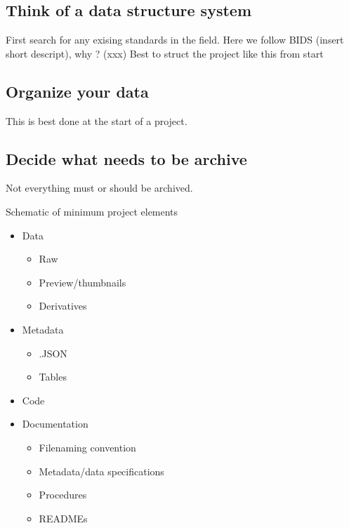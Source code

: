 \documentclass[a4paper,11pt]{report}\usepackage[]{graphicx}\usepackage[dvipsnames]{xcolor}
\begin{document}
\subsection*{Think of a data structure system}

First search for any exising standards in the field. Here we follow BIDS (insert short descript), why ? (xxx)
Best to struct the project like this from start

\subsection*{Organize your data}
This is best done at the start of a project.

% 
\begin{tcolorbox}[enhanced,fit to height=10cm, 
  colback=linkgreen!85!black!10!white,colframe=linkgreen!75!black,title= \small Folder organization ]
  

  
\end{tcolorbox}




 \subsection*{Decide what needs to be archive}
Not everything must or should be archived. 

Schematic of minimum project elements
\begin{itemize}
    \item  Data
    \begin {itemize} 
        \item Raw
        \item Preview/thumbnails
        \item Derivatives
    \end{itemize}
    \item  Metadata    
    \begin {itemize} 
        \item .JSON 
        \item Tables         
    \end{itemize}
    \item  Code    
    \item  Documentation
    \begin {itemize} 
        \item Filenaming convention
        \item Metadata/data specifications
        \item Procedures       
        \item READMEs 
    \end{itemize}
\end{itemize} 
\end{document}

